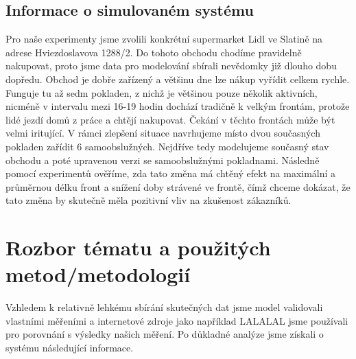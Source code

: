 \documentclass[12pt,a4paper,titlepage]{article}
\begin{document}
\subsection{Informace o simulovaném systému}
Pro naše experimenty jsme zvolili konkrétní supermarket Lidl ve Slatině na adrese Hviezdoslavova 1288/2. Do tohoto obchodu chodíme pravidelně nakupovat, proto jsme data pro modelování sbírali nevědomky již dlouho dobu dopředu. Obchod je dobře zařízený a většinu dne lze nákup vyřídit celkem rychle. Funguje tu až sedm pokladen, z nichž je většinou pouze několik aktivních, nicméně v intervalu mezi 16-19 hodin dochází tradičně k velkým frontám, protože lidé jezdí domů z práce a chtějí nakupovat. Čekání v těchto frontách může být velmi iritující. V rámci zlepšení situace  navrhujeme místo dvou současných pokladen zařídit 6 samoobslužných. Nejdříve tedy modelujeme současný stav obchodu a poté upravenou verzi se samoobslužnými pokladnami. Následně pomocí experimentů ověříme, zda tato změna má chtěný efekt na maximální a průměrnou délku front a snížení doby strávené ve frontě, čímž chceme dokázat, že tato změna by skutečně měla pozitivní vliv na zkušenost zákazníků.
\section{Rozbor tématu a použitých metod/metodologií}
Vzhledem k relativně lehkému sbírání skutečných dat jsme model validovali vlastními měřeními a internetové zdroje jako například LALALAL jsme používali pro porovnání s výsledky našich měření. Po důkladné analýze jsme získali o systému následující informace. 
\end{document}

